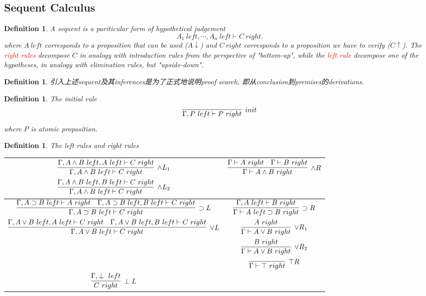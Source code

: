\documentclass{article}
\theoremstyle{plain}
\newtheorem{definition}[theorem]{Definition}
\theoremstyle{nonumberplain}
\newcommand{\redt}[1]{\textcolor{red}{#1}}
\begin{document}
\newpage
\subsection{Sequent Calculus}

\begin{definition}
\rm A sequent is a pariticular form of hypothetical judgement
$$
A_1~left,\cdots,A_n~left \vdash C~right. 
$$
where $A~left$ corresponds to a proposition that can be used ($A\downarrow$) and $C~right$ corresponds to a proposition we have to verify ($C \uparrow$). The \redt{right rules} decompose $C$ in analogy with introduction rules from the perspective of "bottom-up",  while the \redt{left rule} decompose one of the hypotheses, in analogy with elimination rules, but "upside-down". 
\end{definition}


\begin{definition}
\rm 引入上述sequent及其inferences是为了正式地说明proof search, 即从conclusion到premises的derivations.  
\end{definition}

\begin{definition}
\rm The initial rule
$$
\infer[init]{\Gamma, P~left \vdash P~right}{}
$$
where $P$ is atomic proposition. 
\end{definition}

\begin{definition}
\rm The left rules and right rules
\begin{center}
\begin{tabular}{|c|c|}
\hline
$\begin{aligned} \infer[\wedge L_1]{\Gamma, A \wedge B~left \vdash C~right}{\Gamma, A \wedge B~left, A~left \vdash C~right}\\ \infer[\wedge L_2]{\Gamma, A \wedge B~left \vdash C~right}{\Gamma, A \wedge B~left, B~left \vdash C~right}\end{aligned}$ &  $\infer[\wedge R]{\Gamma \vdash A \wedge B ~right}{\Gamma \vdash A~right & \Gamma \vdash B~right}$ \rule{0mm}{15mm}\\
\hline
$\infer[\supset L]{\Gamma, A \supset B~left \vdash C~right}{\Gamma, A \supset B~left \vdash A~right & \Gamma, A \supset B~left, B~left \vdash C~right}$ & $\infer[\supset R]{\Gamma \vdash A~left \supset B~right}{\Gamma, A~left \vdash B~right}$ \rule{0mm}{10mm} \\
\hline
 $\infer[\vee L]{\Gamma, A \vee B~left \vdash C~right}{\Gamma, A \vee B~left,A~left \vdash C~right & \Gamma, A \vee B~left, B~left \vdash C~right}$ & $\begin{aligned}\infer[\vee R_1]{\Gamma\vdash A \vee B~right}{A~right} \\ \infer[\vee R_2]{\Gamma\vdash A \vee B~right}{B~right} \end{aligned}$ \rule{0mm}{15mm} \\
\hline
& $\infer[\top R]{\Gamma \vdash \top~right}{}$ \rule{0mm}{10mm}  \\
\hline
$\infer[\perp L]{C~right}{\Gamma,\perp~left}$ & \rule{0mm}{10mm}\\
\hline
\end{tabular}
\end{center}
\end{definition}
\end{document}

